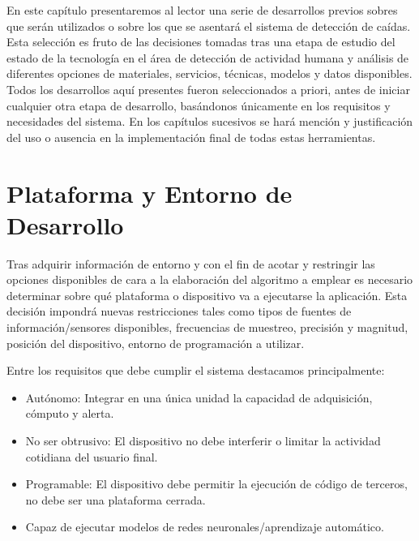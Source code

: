 
\iffalse
info{Indicar el trabajo previo realizado para guiar el desarrollo del software.
Debe identificar adecuadamente el problema a tratar, contexto adecuado de uso y funcionamiento de la aplicación. Idealmente se debería realizar con expertos en la materia a tratar.}

todo{referenciar los requisitos de un sistema de detección de caídas, en detalle si es posible}
\fi

En este capítulo presentaremos al lector una serie de desarrollos previos sobres que serán utilizados o sobre los que se asentará el sistema de detección de caídas. Esta selección es fruto de las decisiones tomadas tras una etapa de estudio del estado de la tecnología en el área de detección de actividad humana y análisis de diferentes opciones de materiales, servicios, técnicas, modelos y datos disponibles. Todos los desarrollos aquí presentes fueron seleccionados a priori, antes de iniciar cualquier otra etapa de desarrollo, basándonos únicamente en los requisitos y necesidades del sistema. En los capítulos sucesivos se hará mención y justificación del uso o ausencia en la implementación final de todas estas herramientas.

\section{Plataforma y Entorno de Desarrollo}\label{sec:req:plataforma}

Tras adquirir información de entorno y con el fin de acotar y restringir las opciones disponibles de cara a la elaboración del algoritmo a emplear es necesario determinar sobre qué plataforma o dispositivo va a ejecutarse la aplicación. Esta decisión impondrá nuevas restricciones tales como tipos de fuentes de información/sensores disponibles, frecuencias de muestreo, precisión y magnitud, posición del dispositivo, entorno de programación a utilizar.

Entre los requisitos que debe cumplir el sistema destacamos principalmente:

\begin{itemize}
  \item Autónomo: Integrar en una única unidad la capacidad de adquisición, cómputo y alerta.
  \item No ser obtrusivo: El dispositivo no debe interferir o limitar la actividad cotidiana del usuario final.
  \item Programable: El dispositivo debe permitir la ejecución de código de terceros, no debe ser una plataforma cerrada.
  \item Capaz de ejecutar modelos de redes neuronales/aprendizaje automático.
\end{itemize}

